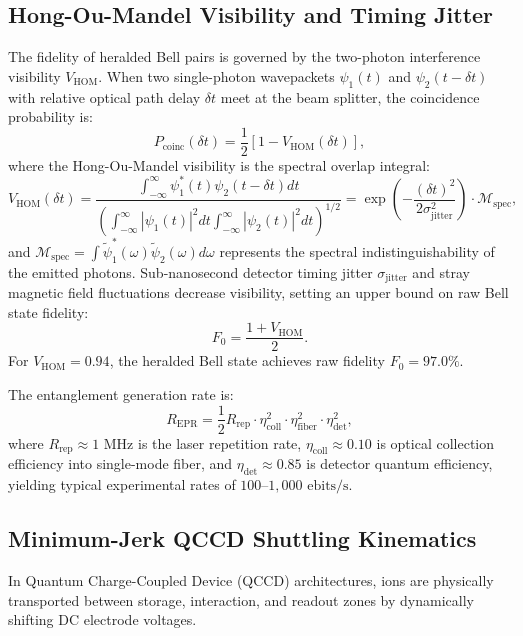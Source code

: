 \subsection{Hong-Ou-Mandel Visibility and Timing Jitter}
The fidelity of heralded Bell pairs is governed by the two-photon interference visibility $V_{\text{HOM}}$. When two single-photon wavepackets $\psi_1(t)$ and $\psi_2(t - \delta t)$ with relative optical path delay $\delta t$ meet at the beam splitter, the coincidence probability is:
\begin{equation}
    P_{\text{coinc}}(\delta t) = \frac{1}{2} \left[ 1 - V_{\text{HOM}}(\delta t) \right],
\end{equation}
where the Hong-Ou-Mandel visibility is the spectral overlap integral:
\begin{equation}
    V_{\text{HOM}}(\delta t) = \frac{\int_{-\infty}^{\infty} \psi_1^*(t) \psi_2(t - \delta t) dt}{\left( \int_{-\infty}^{\infty} |\psi_1(t)|^2 dt \int_{-\infty}^{\infty} |\psi_2(t)|^2 dt \right)^{1/2}} = \exp\left( -\frac{(\delta t)^2}{2 \sigma_{\text{jitter}}^2} \right) \cdot \mathcal{M}_{\text{spec}},
    \label{eq:hom_visibility_jitter}
\end{equation}
and $\mathcal{M}_{\text{spec}} = \int \tilde{\psi}_1^*(\omega) \tilde{\psi}_2(\omega) d\omega$ represents the spectral indistinguishability of the emitted photons. Sub-nanosecond detector timing jitter $\sigma_{\text{jitter}}$ and stray magnetic field fluctuations decrease visibility, setting an upper bound on raw Bell state fidelity:
\begin{equation}
    F_0 = \frac{1 + V_{\text{HOM}}}{2}.
\end{equation}
For $V_{\text{HOM}} = 0.94$, the heralded Bell state achieves raw fidelity $F_0 = 97.0\%$.

The entanglement generation rate is:
\begin{equation}
    R_{\text{EPR}} = \frac{1}{2} R_{\text{rep}} \cdot \eta_{\text{coll}}^2 \cdot \eta_{\text{fiber}}^2 \cdot \eta_{\text{det}}^2,
    \label{eq:trapped_ion_heralding_rate_full}
\end{equation}
where $R_{\text{rep}} \approx 1\text{ MHz}$ is the laser repetition rate, $\eta_{\text{coll}} \approx 0.10$ is optical collection efficiency into single-mode fiber, and $\eta_{\text{det}} \approx 0.85$ is detector quantum efficiency, yielding typical experimental rates of $100\text{--}1,000\text{ ebits/s}$.

\subsection{Minimum-Jerk QCCD Shuttling Kinematics}
In Quantum Charge-Coupled Device (QCCD) architectures, ions are physically transported between storage, interaction, and readout zones by dynamically shifting DC electrode voltages.

